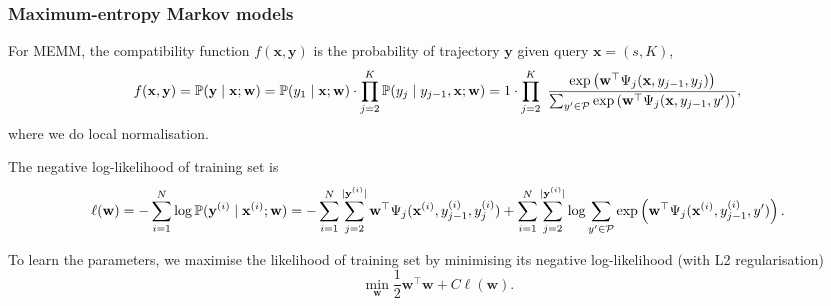 \subsubsection{Maximum-entropy Markov models}
\label{sec:memm}

For MEMM, the compatibility function $f(\mathbf{x}, \mathbf{y})$ is the probability of trajectory $\mathbf{y}$ given query $\mathbf{x} = (s, K)$,
\begin{equation*}
f(\mathbf{x}, \mathbf{y}) 
= \mathbb{P}(\mathbf{y} \mid \mathbf{x}; \mathbf{w}) 
= \mathbb{P}(y_1 \mid \mathbf{x}; \mathbf{w}) \cdot \prod_{j=2}^K \mathbb{P}(y_j \mid y_{j-1}, \mathbf{x}; \mathbf{w})
= 1 \cdot \prod_{j=2}^{K}~
  \frac{\exp \left(\mathbf{w}^\top \Psi_j(\mathbf{x}, y_{j-1}, y_j) \right)}
       {\sum_{y' \in \mathcal{P}} \exp \left(\mathbf{w}^\top \Psi_j(\mathbf{x}, y_{j-1}, y') \right)},
\end{equation*}
where we do local normalisation.

The negative log-likelihood of training set is
\begin{equation*}
\ell(\mathbf{w}) 
= -\sum_{i=1}^N \log \mathbb{P}(\mathbf{y}^{(i)} \mid \mathbf{x}^{(i)}; \mathbf{w}) \\
= -\sum_{i=1}^N \sum_{j=2}^{| \mathbf{y}^{(i)} |} 
                \mathbf{w}^\top \Psi_j(\mathbf{x}^{(i)}, y_{j-1}^{(i)}, y_j^{(i)}) +
   \sum_{i=1}^N \sum_{j=2}^{| \mathbf{y}^{(i)} |} 
                \log \sum_{y' \in \mathcal{P}} \exp \left(\mathbf{w}^\top \Psi_j(\mathbf{x}^{(i)}, y_{j-1}^{(i)}, y') \right).
\end{equation*}

To learn the parameters, we maximise the likelihood of training set by minimising its negative log-likelihood (with L2 regularisation)
\begin{equation}
\label{eq:trainmemm}
\min_{\mathbf{w}} \frac{1}{2} \mathbf{w}^\top \mathbf{w} + C \ell(\mathbf{w}).
\end{equation}


